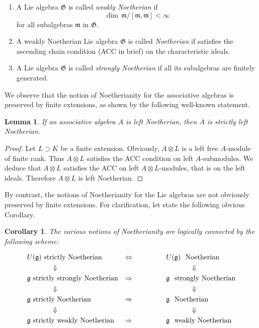 \documentclass[11pt, letterpaper, reqno]{amsart}
\newtheorem{cor}[theorem]{Corollary}
\newtheorem{lemma}[theorem]{Lemma}
\theoremstyle{definition}
\newcommand{\fg}{\mathfrak{g}}
\newcommand{\fm}{\mathfrak{m}}
\newcommand{\fG}{\mathfrak{G}}
\begin{document}
\begin{enumerate}
\item[(1)]
A Lie algebra $\fG$ is called {\it weakly Noetherian}  if 
$$\dim\,\fm/[\fm,\fm]<\infty$$
\noindent for all subalgebras $\fm$ in $\fG$.
\item[(2)]
A weakly Noetherian Lie algebra $\fG$ is called
{\it Noetherian} if  satisfies the  ascending chain condition (ACC in brief)  on 
the characteristic ideals.
\item[(3)]
A Lie algebra $\fG$ is called {\it strongly Noetherian} if all its subalgebras are finitely generated. 
\end{enumerate}


We observe that the notion of Noetherianity for
the associative algebras is preserved by finite 
extensions, as shown by the following 
well-known statement.



\begin{lemma} If an associative algebra $A$
 is left Noetherian, then $A$ is strictly left  Noetherian.
\end{lemma}

\begin{proof} Let $L\supset K$ be a finite extension. Obviously, 
$A\otimes L$ is
a left free $A$-module of finite rank.
Thus $A\otimes L$ satisfies the ACC condition on left $A$-submodules. We deduce that $A\otimes L$ satisfies the ACC on left $A\otimes L$-modules, that is on the left ideals.
Therefore
$A\otimes L$ is left Noetherian.
\end{proof}

By contrast,  the notions of Noetherianity for the Lie algebras are  not obviously preserved by finite extensions. For clarification, let state the following obvious Corollary.


\begin{cor}\label{logical} The various notions of Noetherianity are logically connected by the following scheme:


\begin{align*}
&U(\fg) \text{\,\,strictly Noetherian}
&\Leftrightarrow \hskip17mm & U(\fg) \text{\,\, Noetherian}\\
&\hskip12mm \Downarrow&&\hskip12mm\Downarrow\\
&\fg \text{\,\,strictly strongly Noetherian}&
\Rightarrow\hskip17mm
&\fg \text{\,\, strongly Noetherian}\\
&\hskip12mm \Downarrow&&\hskip12mm\Downarrow\\
&\fg \text{\,\,strictly Noetherian}&
\Rightarrow\hskip17mm
&\fg \text{\,\, Noetherian}\\
&\hskip12mm\Downarrow&&\hskip12mm\Downarrow\\
&\fg \text{\,\,strictly weakly Noetherian}
&\Rightarrow\hskip17mm &\fg \text{\,\, weakly Noetherian}
\end{align*}
\end{cor}
\end{document}
